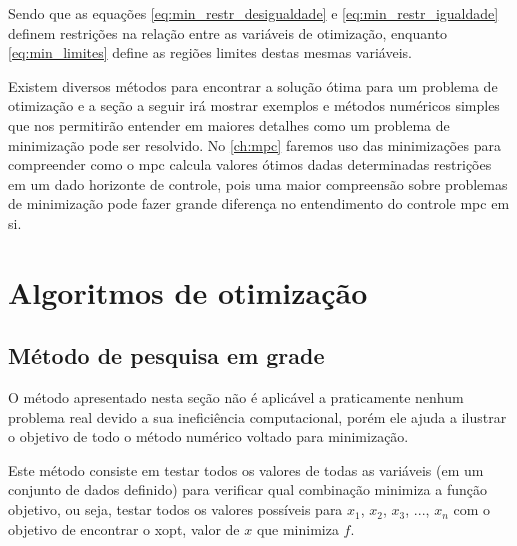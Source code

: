 Sendo que as equações \ref{eq:min_restr_desigualdade} e \ref{eq:min_restr_igualdade}
definem restrições na relação entre as variáveis de otimização, enquanto
\ref{eq:min_limites} define as regiões limites destas mesmas variáveis.

Existem diversos métodos para encontrar a solução ótima para um problema de otimização
e a seção a seguir irá mostrar exemplos e métodos numéricos simples que nos permitirão
entender em maiores detalhes como um problema de minimização pode ser resolvido. No
\cref{ch:mpc} faremos uso das minimizações para compreender como o \acrshort{mpc}
calcula valores ótimos dadas determinadas restrições em um dado horizonte de controle,
pois uma maior compreensão sobre problemas de minimização pode fazer grande diferença
no entendimento do controle \acrshort{mpc} em si.

\section{Algoritmos de otimização}
\label{sec:algoritmos_de_otimizacao}

\subsection{Método de pesquisa em grade}
\label{subsec:metodo_pesquisa_em_grade}

O método apresentado nesta seção não é aplicável a praticamente nenhum problema real
devido a sua ineficiência computacional, porém ele ajuda a ilustrar o objetivo de
todo o método numérico voltado para minimização.

Este método consiste em testar todos os valores de todas as variáveis (em um conjunto
de dados definido) para verificar qual combinação minimiza a função objetivo, ou seja,
testar todos os valores possíveis para $x_1$, $x_2$, $x_3$, $...$, $x_n$ com o
objetivo de encontrar o \gls{xopt}, valor de $x$ que minimiza $f$.


